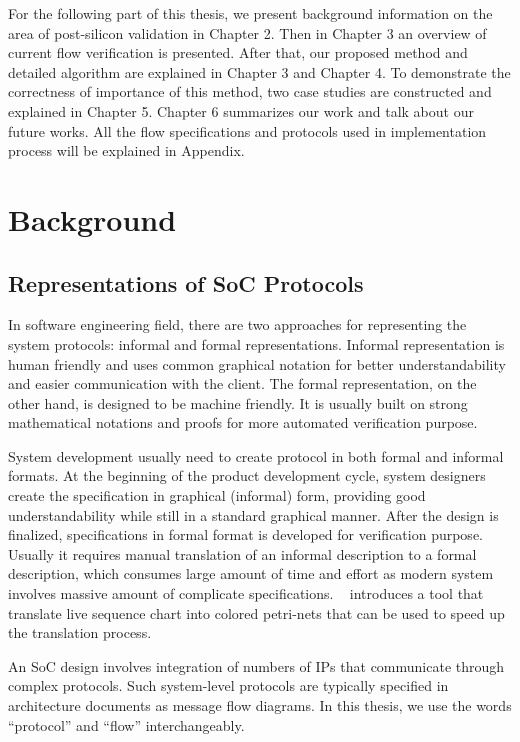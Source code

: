 \documentclass[12pt,frontmatter,copyright,thesis]{usfmanus}
\begin{document}
For the following part of this thesis, 
we present background information on the area of post-silicon validation in Chapter 2. 
Then in Chapter 3 an overview of current flow verification is presented. 
After that, our proposed method and detailed algorithm are explained in Chapter 3 and Chapter 4. 
To demonstrate the correctness of importance of this method, two case studies are constructed and explained
in Chapter 5.
Chapter 6 summarizes our work and talk about our future works. All the flow specifications and protocols used in implementation process will be explained in Appendix.


\chapter{Background}
 \section{Representations of SoC Protocols }
  
 In software engineering field, there are two approaches for representing the system protocols: informal
 and formal representations.
  Informal representation is human friendly and uses common 
  graphical notation for better understandability and easier communication with the client. 
The formal representation, on the other hand, is designed to be machine friendly.
It is usually built on strong mathematical notations and proofs for
more automated verification purpose.

System development usually need to create protocol
in both formal and informal formats. 
At the beginning of the product development cycle, 
system designers create the specification
in graphical (informal) form,
providing good understandability while still
in a standard graphical manner.
After the design is finalized, specifications in formal format is developed
for verification purpose.
Usually it requires manual translation of an informal description to a formal description, 
which 
consumes large amount of time and effort
as modern system involves massive amount of complicate specifications. 
 ~\cite{lsctocpn} introduces a tool that translate live sequence chart
into colored petri-nets that can be used to
speed up the translation process.

 An SoC design involves integration of numbers of IPs that
communicate through complex protocols.  Such system-level
protocols are typically specified in architecture documents
as message flow diagrams. In this thesis, we use the words
``protocol'' and ``flow'' interchangeably.
\end{document}
